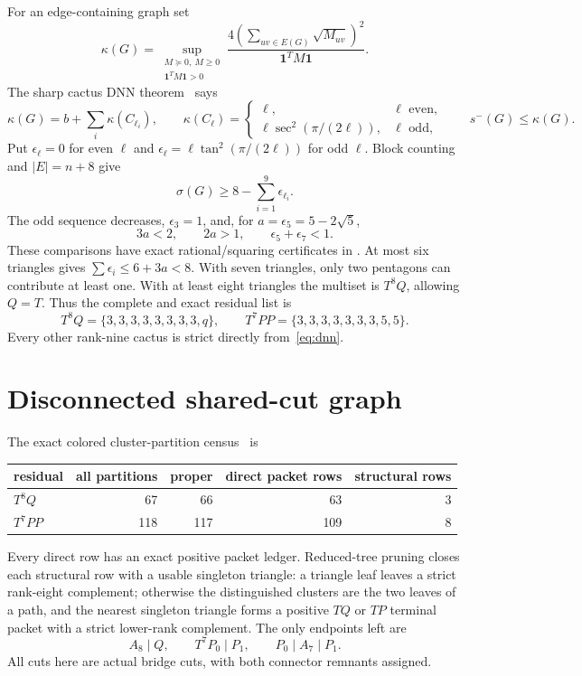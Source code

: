 \documentclass[11pt]{article}
\newcommand{\smE}{s^-}
\newcommand{\sig}{\sigma}
\newcommand{\one}{\mathbf 1}
\begin{document}
For an edge-containing graph set
\[
 \kappa(G)=\sup_{\substack{M\succeq0,\ M\geq0\\\one^TM\one>0}}
 \frac{4(\sum_{uv\in E(G)}\sqrt{M_{uv}})^2}{\one^TM\one}.
\]
The sharp cactus DNN theorem~\cite{DNN,LTZ} says
\[
 \kappa(G)=b+\sum_i\kappa(C_{\ell_i}),\qquad
 \kappa(C_\ell)=\begin{cases}
 \ell,&\ell\text{ even},\\
 \ell\sec^2(\pi/(2\ell)),&\ell\text{ odd},
 \end{cases}
 \qquad \smE(G)\leq\kappa(G).
\]
Put $\epsilon_\ell=0$ for even $\ell$ and
$\epsilon_\ell=\ell\tan^2(\pi/(2\ell))$ for odd $\ell$.  Block counting and
$|E|=n+8$ give
\begin{equation}\label{eq:dnn}
 \sig(G)\geq8-\sum_{i=1}^9\epsilon_{\ell_i}.
\end{equation}
The odd sequence decreases, $\epsilon_3=1$, and, for
$a=\epsilon_5=5-2\sqrt5$,
\[
 3a<2,\qquad2a>1,\qquad\epsilon_5+\epsilon_7<1.
\]
These comparisons have exact rational/squaring certificates in
\cite{DNNResidual}.  At most six triangles gives
$\sum\epsilon_i\leq6+3a<8$.  With seven triangles, only two pentagons can
contribute at least one.  With at least eight triangles the multiset is
$T^8Q$, allowing $Q=T$.  Thus the complete and exact residual list is
\begin{equation}\label{eq:residuals}
 T^8Q=\{3,3,3,3,3,3,3,3,q\},\qquad
 T^7PP=\{3,3,3,3,3,3,3,5,5\}.
\end{equation}
Every other rank-nine cactus is strict directly from~\eqref{eq:dnn}.

\section{Disconnected shared-cut graph}

The exact colored cluster-partition census~\cite{ResidualCensus} is
\begin{center}
\begin{tabular}{lrrrr}
\toprule
residual&all partitions&proper&direct packet rows&structural rows\\
\midrule
$T^8Q$&67&66&63&3\\
$T^7PP$&118&117&109&8\\
\bottomrule
\end{tabular}
\end{center}
Every direct row has an exact positive packet ledger.  Reduced-tree pruning
closes each structural row with a usable singleton triangle: a triangle leaf
leaves a strict rank-eight complement; otherwise the distinguished clusters
are the two leaves of a path, and the nearest singleton triangle forms a
positive $TQ$ or $TP$ terminal packet with a strict lower-rank complement.
The only endpoints left are
\begin{equation}\label{eq:endpoints}
 A_8\mid Q,\qquad T^7P_0\mid P_1,\qquad P_0\mid A_7\mid P_1.
\end{equation}
All cuts here are actual bridge cuts, with both connector remnants assigned.
\end{document}
